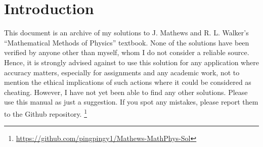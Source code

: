 \section{Introduction}

This document is an archive of my solutions to J. Mathews and R. L. Walker's ``Mathematical Methods of Physics'' textbook.
None of the solutions have been verified by anyone other than myself, whom I do not consider a reliable source.
Hence, it is strongly advised against to use this solution for any application where accuracy matters,
especially for assignments and any academic work,
not to mention the ethical implications of such actions where it could be considered as cheating.
However, I have not yet been able to find any other solutions.
Please use this manual as just a suggestion.
If you spot any mistakes, please report them to the Github repository.
\footnote{\faGithubSquare{} \url{https://github.com/pingpingy1/Mathews-MathPhys-Sol}}